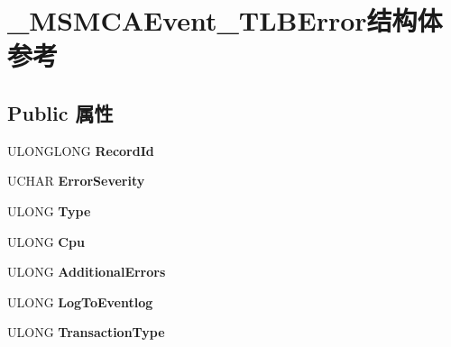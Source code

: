 \hypertarget{struct___m_s_m_c_a_event___t_l_b_error}{}\section{\+\_\+\+M\+S\+M\+C\+A\+Event\+\_\+\+T\+L\+B\+Error结构体 参考}
\label{struct___m_s_m_c_a_event___t_l_b_error}
\subsection*{Public 属性}
\begin{DoxyCompactItemize}
\item 
\mbox{\label{struct___m_s_m_c_a_event___t_l_b_error_abd14c3ca93ca0239b1af093be2ac492a}} 
U\+L\+O\+N\+G\+L\+O\+NG {\bfseries Record\+Id}
\item 
\mbox{\label{struct___m_s_m_c_a_event___t_l_b_error_a71c1266378e1944b02f46ca55a5d0ed2}} 
U\+C\+H\+AR {\bfseries Error\+Severity}
\item 
\mbox{\label{struct___m_s_m_c_a_event___t_l_b_error_a64b2ee94e166addf3d0353ce72031bd0}} 
U\+L\+O\+NG {\bfseries Type}
\item 
\mbox{\label{struct___m_s_m_c_a_event___t_l_b_error_ae83ef5d42d42a1731975eaadfdcfc557}} 
U\+L\+O\+NG {\bfseries Cpu}
\item 
\mbox{\label{struct___m_s_m_c_a_event___t_l_b_error_a0fe2f66c9c63c2d93313b0d6324bac1e}} 
U\+L\+O\+NG {\bfseries Additional\+Errors}
\item 
\mbox{\label{struct___m_s_m_c_a_event___t_l_b_error_a517c32466827457dc86ad48bbdbb4a37}} 
U\+L\+O\+NG {\bfseries Log\+To\+Eventlog}
\item 
\mbox{\label{struct___m_s_m_c_a_event___t_l_b_error_a50c02fb0794d718798ee936d537a6c1c}} 
U\+L\+O\+NG {\bfseries Transaction\+Type}
\item 
\mbox{\label{struct___m_s_m_c_a_event___t_l_b_error_aa9f74019df071abbeffbea7766188dce}} 

\end{DoxyCompactItemize}
